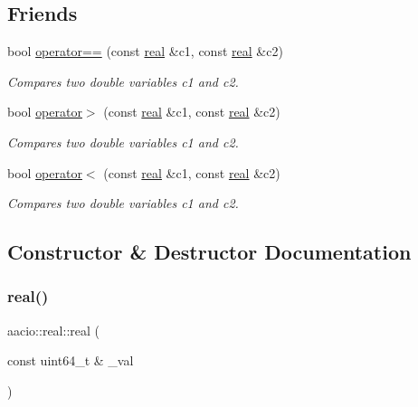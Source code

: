 \subsection*{Friends}
\begin{DoxyCompactItemize}
\item 
bool \mbox{\hyperlink{classaacio_1_1real_a5a7c02baf325d5f9351d3e348f779f5a}{operator==}} (const \mbox{\hyperlink{classaacio_1_1real}{real}} \&c1, const \mbox{\hyperlink{classaacio_1_1real}{real}} \&c2)
\begin{DoxyCompactList}\small\item\em Compares two double variables c1 and c2. \end{DoxyCompactList}\item 
bool \mbox{\hyperlink{classaacio_1_1real_aef9761f53a00fd4debd021a192449396}{operator$>$}} (const \mbox{\hyperlink{classaacio_1_1real}{real}} \&c1, const \mbox{\hyperlink{classaacio_1_1real}{real}} \&c2)
\begin{DoxyCompactList}\small\item\em Compares two double variables c1 and c2. \end{DoxyCompactList}\item 
bool \mbox{\hyperlink{classaacio_1_1real_af2fed6b34d60d75b613ab1d3078d102c}{operator$<$}} (const \mbox{\hyperlink{classaacio_1_1real}{real}} \&c1, const \mbox{\hyperlink{classaacio_1_1real}{real}} \&c2)
\begin{DoxyCompactList}\small\item\em Compares two double variables c1 and c2. \end{DoxyCompactList}\end{DoxyCompactItemize}


\subsection{Constructor \& Destructor Documentation}
\mbox{\label{classaacio_1_1real_a79591ac3c57ad6295b75cef14d8e9fdb}} 
\subsubsection{\texorpdfstring{real()}{real()}}
{\footnotesize\ttfamily aacio\+::real\+::real (\begin{DoxyParamCaption}\item[{const uint64\+\_\+t \&}]{\+\_\+val }\end{DoxyParamCaption})\hspace{0.3cm}{\ttfamily [inline]}}




